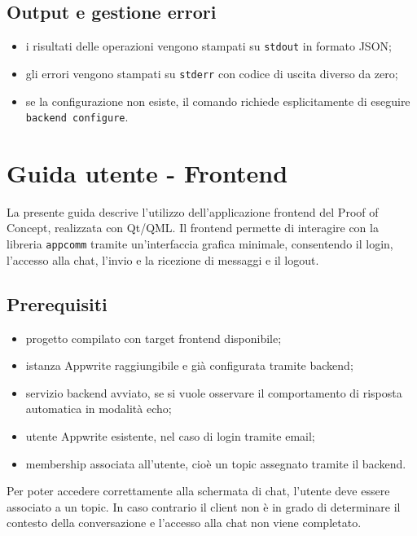 \documentclass[a4paper, 11pt, twoside]{report}
\newif\ifshowlogo
\newcommand{\blankpage}{
    \clearpage
    \thispagestyle{empty}     %
    \showlogofalse            %
    \hbox{}                   %
    \newpage
    \showlogotrue             %
}
\begin{document}
\section{Output e gestione errori}

\begin{itemize}
    \item i risultati delle operazioni vengono stampati su \texttt{stdout} in formato JSON;
    \item gli errori vengono stampati su \texttt{stderr} con codice di uscita diverso da zero;
    \item se la configurazione non esiste, il comando richiede esplicitamente di eseguire \texttt{backend configure}.
\end{itemize}

\blankpage

\chapter{Guida utente - Frontend}\label{chp:frontendguide}

La presente guida descrive l'utilizzo dell'applicazione frontend del Proof of Concept, realizzata con Qt/QML. Il frontend permette di
interagire con la libreria \texttt{appcomm} tramite un'interfaccia grafica minimale, consentendo il login, l'accesso alla chat,
l'invio e la ricezione di messaggi e il logout.

\section{Prerequisiti}

\begin{itemize}
    \item progetto compilato con target frontend disponibile;
    \item istanza Appwrite raggiungibile e già configurata tramite backend;
    \item servizio backend avviato, se si vuole osservare il comportamento di risposta automatica in modalità echo;
    \item utente Appwrite esistente, nel caso di login tramite email;
    \item membership associata all'utente, cioè un topic assegnato tramite il backend.
\end{itemize}

\noindent Per poter accedere correttamente alla schermata di chat, l'utente deve essere associato a un topic. In caso contrario il
client non è in grado di determinare il contesto della conversazione e l'accesso alla chat non viene completato.
\end{document}
